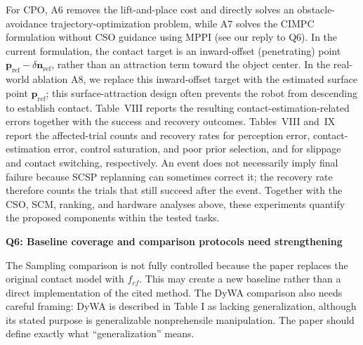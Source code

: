 \documentclass[journal,10pt]{IEEEtran}
\newcommand{\question}[2]{\par\smallskip\noindent
 \color{responseblue}\textbf{Q#1: #2}\par\nobreak\noindent\color{responseblue}}
\begin{document}
For CPO, A6 removes the lift-and-place cost and directly solves an obstacle-avoidance trajectory-optimization problem, while A7 solves the CIMPC formulation without CSO guidance using MPPI (see our reply to Q6). In the current formulation, the contact target is an inward-offset (penetrating) point $\boldsymbol{p}_{\mathrm{ref}}-\delta\boldsymbol{n}_{\mathrm{ref}}$, rather than an attraction term toward the object center. In the real-world ablation A8, we replace this inward-offset target with the estimated surface point $\boldsymbol{p}_{\mathrm{ref}}$; this surface-attraction design often prevents the robot from descending to establish contact. Table~VIII reports the resulting contact-estimation-related errors together with the success and recovery outcomes. Tables~VIII and~IX report the affected-trial counts and recovery rates for perception error, contact-estimation error, control saturation, and poor prior selection, and for slippage and contact switching, respectively. An event does not necessarily imply final failure because SCSP replanning can sometimes correct it; the recovery rate therefore counts the trials that still succeed after the event. Together with the CSO, SCM, ranking, and hardware analyses above, these experiments quantify the proposed components within the tested tasks.

\question{6}{Baseline coverage and comparison protocols need strengthening}

The Sampling comparison is not fully controlled because the paper replaces the original contact model with $f_{cf}$. This may create a new baseline rather than a direct implementation of the cited method. The DyWA comparison also needs careful framing: DyWA is described in Table I as lacking generalization, although its stated purpose is generalizable nonprehensile manipulation. The paper should define exactly what ``generalization'' means.
\end{document}
